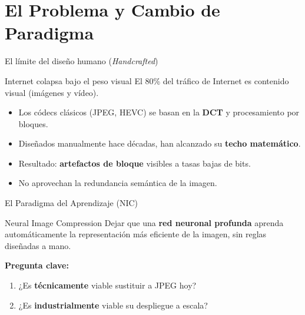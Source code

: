 \section{El Problema y Cambio de Paradigma}


\begin{frame}{El límite del diseño humano (\textit{Handcrafted})}
\begin{alertblock}{Internet colapsa bajo el peso visual}
El 80\% del tráfico de Internet es contenido visual (imágenes y vídeo).
\end{alertblock}
\begin{itemize}
    \item Los códecs clásicos (JPEG, HEVC) se basan en la \textbf{DCT} y procesamiento por bloques.
    \item Diseñados manualmente hace décadas, han alcanzado su \textbf{techo matemático}.
    \item Resultado: \textbf{artefactos de bloque} visibles a tasas bajas de bits.
    \item No aprovechan la redundancia semántica de la imagen.
\end{itemize}
\end{frame}

\begin{frame}{El Paradigma del Aprendizaje (NIC)}
\begin{block}{Neural Image Compression}
Dejar que una \textbf{red neuronal profunda} aprenda automáticamente la representación más eficiente de la imagen, sin reglas diseñadas a mano.
\end{block}
\vspace{0.5cm}
\textbf{Pregunta clave:}
\begin{enumerate}
    \item ¿Es \textbf{técnicamente} viable sustituir a JPEG hoy?
    \item ¿Es \textbf{industrialmente} viable su despliegue a escala?
\end{enumerate}
\end{frame}
